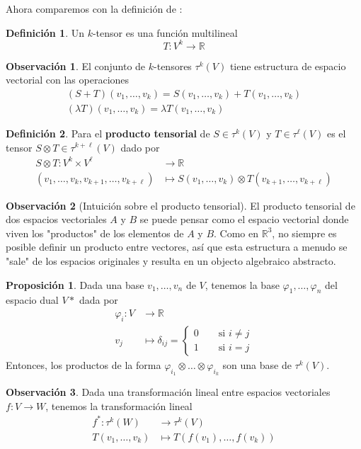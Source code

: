 \documentclass[spanish]{book}
\theoremstyle{definition}
\newtheorem*{defn}{Definición}
\newtheorem*{prop}{Proposición}
\newtheorem*{obs}{Observación}
\newcommand{\R}{\mathbb{R}}
\begin{document}
	Ahora comparemos con la definición de \cite{Spivak}:
	\begin{defn}
		Un $k$-tensor es una función multilineal
		\[T:V^k\to\R\]
	\end{defn}
	\begin{obs}
		El conjunto de $k$-tensores $\tau^k(V)$  tiene estructura de espacio vectorial con las operaciones
		\begin{align*}
			(S+T)(v_1,\ldots,v_k)=S(v_1,\ldots,v_k)+T(v_1,\ldots,v_k)\\
			(\lambda T)(v_1,\ldots,v_k)=\lambda T(v_1,\ldots,v_k)
		\end{align*}
	\end{obs}
	\begin{defn}
		Para  el \textbf{producto tensorial} de $S\in\tau^k(V)$ y $T\in\tau^\ell(V)$ es el tensor $S\otimes T\in\tau^{k+\ell}(V)$ dado por
		\begin{align*}
			S\otimes T:V^k\times V^\ell&\to\R\\
			(v_1,\ldots,v_k,v_{k+1},\ldots,v_{k+\ell})&\mapsto S(v_1,\ldots,v_k)\otimes T(v_{k+1},\ldots,v_{k+\ell})
		\end{align*}
	\end{defn}
	\begin{obs}[Intuición sobre el producto tensorial]
		El producto tensorial de dos espacios vectoriales $A$ y $B$ se puede pensar como el espacio vectorial donde viven los "productos" de los elementos de $A$ y $B$. Como en $\R^3$, no siempre es posible definir un producto entre vectores, así que esta estructura a menudo se "sale" de los espacios originales y resulta en un objecto algebraico abstracto.
	\end{obs}
	\begin{prop}
		Dada una base $v_1,\ldots,v_n$ de $V$, tenemos la base $\varphi_1,\ldots,\varphi_n$ del espacio dual $V*$ dada por
		\begin{align*}
			\varphi_i:V&\to\R\\
			v_j&\mapsto\delta_{ij}=\begin{cases}
				0\qquad\text{si }i\neq j\\
				1\qquad\text{si }i=j
			\end{cases}
		\end{align*}
		Entonces, los productos de la forma $\varphi_{i_1}\otimes\ldots\otimes\varphi_{i_k}$ son una base de $\tau^k(V)$.
	\end{prop}
	\begin{obs}\label{pullback}
		Dada una transformación lineal entre espacios vectoriales $f:V\to W$, tenemos la transformación lineal 
		\begin{align*}
			f^*:\tau^k(W)&\to\tau^k(V)\\
			T(v_1,\ldots,v_k)&\mapsto T(f(v_1),\ldots,f(v_k))
		\end{align*}
	\end{obs}
\end{document}
